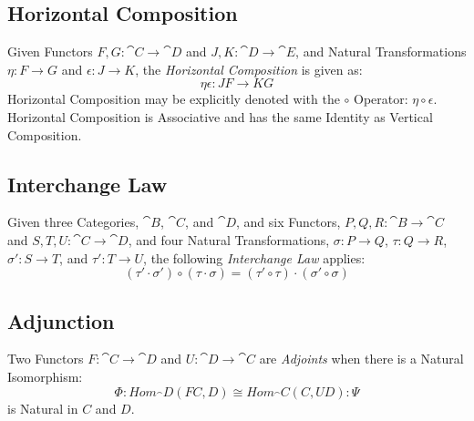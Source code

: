\subsection{Horizontal Composition}\label{sec:horizontal_composition}

Given Functors $F,G : \cat{C} \rightarrow \cat{D}$ and $J,K :
\cat{D} \rightarrow \cat{E}$, and Natural Transformations $\eta
: F \rightarrow G$ and $\epsilon : J \rightarrow K$, the
\emph{Horizontal Composition} is given as:
\[
  \eta \epsilon : JF \rightarrow KG
\]
Horizontal Composition may be explicitly denoted with the $\circ$
Operator: $\eta \circ \epsilon$. Horizontal Composition is Associative
and has the same Identity as Vertical Composition.



\subsection{Interchange Law}\label{sec:interchange_law}

Given three Categories, $\cat{B}$, $\cat{C}$, and $\cat{D}$,
and six Functors, $P,Q,R : \cat{B} \rightarrow \cat{C}$ and
$S,T,U : \cat{C} \rightarrow \cat{D}$, and four Natural
Transformations, $\sigma : P \rightarrow Q$, $\tau : Q \rightarrow R$,
$\sigma' : S \rightarrow T$, and $\tau' : T \rightarrow U$, the
following \emph{Interchange Law} applies:
\[
  (\tau' \cdot \sigma') \circ (\tau \cdot \sigma) =
  (\tau' \circ \tau) \cdot (\sigma' \circ \sigma)
\]



\subsection{Adjunction}\label{sec:adjoint}


Two Functors $F : \cat{C} \rightarrow \cat{D}$ and $U :
\cat{D} \rightarrow \cat{C}$ are \emph{Adjoints} when there is a
Natural Isomorphism:
\[
  \Phi : Hom_\cat{D}(F C,D) \cong Hom_\cat{C}(C,U D) : \Psi
\]
is Natural in $C$ and $D$.

